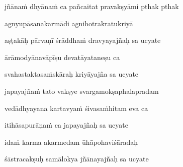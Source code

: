 jñāna\.m dhyāna\.m ca pañcaitat pravakṣyāmi pthak pthak \veg\dontdisplaylinenum



agnyupāsanakarmādi agnihotrakratukriyā\thinspace{\dandab} \dontdisplaylinenum

aṣṭakāḥ pārvaṇī śrāddha\.m dravyayajñaḥ sa ucyate \veg\dontdisplaylinenum



ārāmodyānavāpīṣu devatāyataneṣu ca\thinspace{\dandab} \dontdisplaylinenum

svahastaktasa\.mskāraḥ kriyāyajña sa ucyate \veg\dontdisplaylinenum



japayajña\.m tato vakṣye svargamokṣaphalapradam\thinspace{\dandab} \dontdisplaylinenum

vedādhyayana kartavya\.m śivasa\.mhitam eva ca \veg\dontdisplaylinenum

itihāsapurāṇa\.m ca japayajñaḥ sa ucyate\thinspace{\dandab} \dontdisplaylinenum



ida\.m karma akarmedam ūhāpohaviśāradaḥ \veg\dontdisplaylinenum

śāstracakṣuḥ samālokya jñānayajñaḥ sa ucyate\thinspace{\dandab} \dontdisplaylinenum

